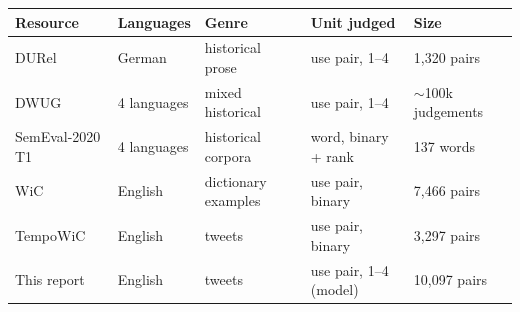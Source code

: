 \begin{tabular}{@{}lllll@{}}
\toprule
Resource & Languages & Genre & Unit judged & Size \\
\midrule
DURel \citep{schlechtweg2018durel} & German & historical prose & use pair, 1--4 & 1{,}320 pairs \\
DWUG \citep{schlechtweg2021dwug} & 4 languages & mixed historical & use pair, 1--4 & $\sim$100k judgements \\
SemEval-2020 T1 \citep{schlechtweg2020semeval} & 4 languages & historical corpora & word, binary + rank & 137 words \\
WiC \citep{pilehvar2019wic} & English & dictionary examples & use pair, binary & 7{,}466 pairs \\
TempoWiC \citep{loureiro2022tempowic} & English & tweets & use pair, binary & 3{,}297 pairs \\
\midrule
This report & English & tweets & use pair, 1--4 (model) & 10{,}097 pairs \\
\bottomrule
\end{tabular}